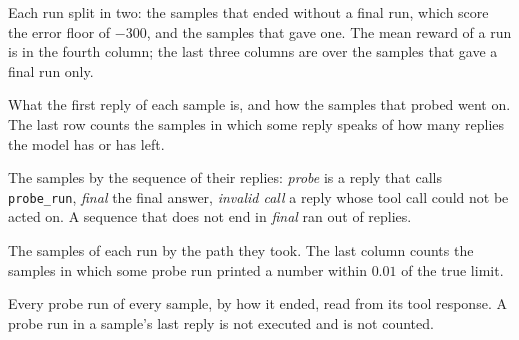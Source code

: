 \documentclass[11pt,a4paper]{article}
\begin{document}
\begin{table}[h]
\centering\small

\caption{Each run split in two: the samples that ended without a final run,
which score the error floor of $-300$, and the samples that gave one. The
mean reward of a run is in the fourth column; the last three columns are
over the samples that gave a final run only.}
\label{tab:answered}
\end{table}

\begin{table}[h]
\centering\small
\resizebox{\linewidth}{!}{}
\caption{What the first reply of each sample is, and how the samples that
probed went on. The last row counts the samples in which some reply speaks
of how many replies the model has or has left.}
\label{tab:first-actions}
\end{table}

\begin{table}[h]
\centering\small
\resizebox{\linewidth}{!}{}
\caption{The samples by the sequence of their replies: \emph{probe} is a
reply that calls \texttt{probe\_run}, \emph{final} the final answer,
\emph{invalid call} a reply whose tool call could not be acted on. A
sequence that does not end in \emph{final} ran out of replies.}
\label{tab:sequences}
\end{table}

\begin{table}[h]
\centering\small
\resizebox{\linewidth}{!}{}
\caption{The samples of each run by the path they took. The last column
counts the samples in which some probe run printed a number within $0.01$
of the true limit.}
\label{tab:by-path}
\end{table}

\begin{table}[h]
\centering\small
\resizebox{\linewidth}{!}{}
\caption{Every probe run of every sample, by how it ended, read from its
tool response. A probe run in a sample's last reply is not executed and is
not counted.}
\label{tab:probe-outcomes}
\end{table}
\end{document}
